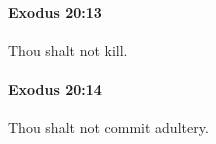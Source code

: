 		\paragraph{Exodus 20:13} %
			\label{EXODUS-20-13}

			Thou shalt not kill.


		\paragraph{Exodus 20:14} %
			\label{EXODUS-20-14}

			Thou shalt not commit adultery.


